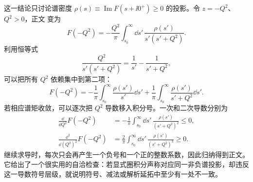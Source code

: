 

\begin{derivation}
这一结论只讨论谱密度 $\rho(s)\equiv\operatorname{Im}F(s+\ii0^+)\ge0$ 的投影。令 $z=-Q^2$、$Q^2>0$，正文 变为
\begin{equation*}
F(-Q^2)
=-\frac{Q^2}{\pi}
\int_{s_0}^{\infty}\dd s'\,
\frac{\rho(s')}{s'(s'+Q^2)}.
\end{equation*}
利用恒等式
\begin{equation*}
\frac{Q^2}{s'(s'+Q^2)}
=\frac1{s'}-\frac1{s'+Q^2},
\end{equation*}
可以把所有 $Q^2$ 依赖集中到第二项：
\begin{equation*}
F(-Q^2)
=-\frac1\pi\int_{s_0}^{\infty}\frac{\rho(s')}{s'}\dd s'
+\frac1\pi\int_{s_0}^{\infty}\frac{\rho(s')}{s'+Q^2}\dd s'.
\end{equation*}
若相应谱矩收敛，可以逐次把 $Q^2$ 导数移入积分号。一次和二次导数分别为
\begin{align*}
\frac{\dd}{\dd Q^2}F(-Q^2)
&=-\frac1\pi\int_{s_0}^{\infty}\dd s'\,
\frac{\rho(s')}{(s'+Q^2)^2}\le0,\\
\frac{\dd^2}{\dd(Q^2)^2}F(-Q^2)
&=\frac{2}{\pi}\int_{s_0}^{\infty}\dd s'\,
\frac{\rho(s')}{(s'+Q^2)^3}\ge0.
\end{align*}
继续求导时，每次只会再产生一个负号和一个正的整数系数，因此归纳得到正文。它给出了一个很实用的自洽检查：若显式圈积分声称对应同一非负谱投影，却违反这一导数符号层级，就说明符号、减法或解析延拓中至少有一处不一致。
\end{derivation}
